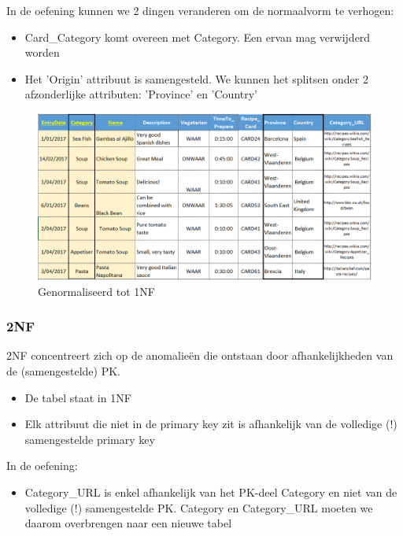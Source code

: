 \documentclass{article}
\begin{document}
In de oefening kunnen we 2 dingen veranderen om de normaalvorm te verhogen:

\begin{itemize}
    \item Card\_Category komt overeen met Category. Een ervan mag verwijderd worden
    \item Het 'Origin' attribuut is samengesteld. We kunnen het splitsen onder 2 afzonderlijke attributen: 'Province' en 'Country'
\end{itemize}

\begin{figure}[H]
    \centering
    \includegraphics[width=\textwidth]{1NF.png}
    \caption{Genormaliseerd tot 1NF}
\end{figure}

\subsubsection{2NF}
2NF concentreert zich op de anomalieën die ontstaan door afhankelijkheden van de (samengestelde) PK.
\begin{itemize}
    \item De tabel staat in 1NF
    \item Elk attribuut die niet in de primary key zit is afhankelijk van de volledige (!) samengestelde primary key 
\end{itemize}

In de oefening:

\begin{itemize}
    \item Category\_URL is enkel afhankelijk van het PK-deel Category en niet van de volledige (!) samengestelde PK. 
    Category en Category\_URL moeten we daarom overbrengen naar een nieuwe tabel
\end{itemize}
\end{document}
